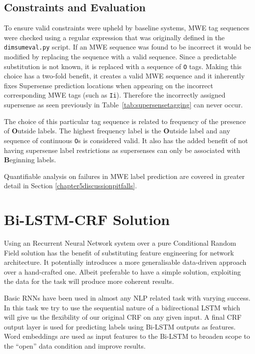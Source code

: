 \subsection{Constraints and Evaluation}

To ensure valid constraints were upheld by baseline systems, MWE tag sequences were checked using a regular expression that was originally defined in the \texttt{dimsumeval.py} script. If an MWE sequence was found to be incorrect it would be modified by replacing the sequence with a valid sequence. Since a predictable substitution is not known, it is replaced with a sequence of \texttt{O} tags. Making this choice has a two-fold benefit, it creates a valid MWE sequence and it inherently fixes Supersense prediction locations when appearing on the incorrect corresponding MWE tags (such as \texttt{Ii}). Therefore the incorrectly assigned supersense as seen previously in Table~\ref{tab:supersensetagging} can never occur. 

The choice of this particular tag sequence is related to frequency of the presence of {\bf O}utside labels. The highest frequency label is the {\bf O}utside label and any sequence of continuous \texttt{O}s is considered valid. It also has the added benefit of not having supersense label restrictions as supersenses can only be associated with {\bf B}eginning labels. 

Quantifiable analysis on failures in MWE label prediction are covered in greater detail in Section \ref{chapter5discussionpitfalls}. 

\section{Bi-LSTM-CRF Solution}

Using an Recurrent Neural Network system over a pure Conditional Random Field solution has the benefit of substituting feature engineering for network architecture. It potentially introduces a more generalisable data-driven approach over a hand-crafted one. Albeit preferable to have a simple solution, exploiting the data for the task will produce more coherent results.

Basic RNNs have been used in almost any NLP related task with varying success. In this task we try to use the sequential nature of a bidirectional LSTM which will give us the flexibility of our original CRF on any given input. A final CRF output layer is used for predicting labels using Bi-LSTM outputs as features. Word embeddings are used as input features to the Bi-LSTM to broaden scope to the ``open'' data condition and improve results.

